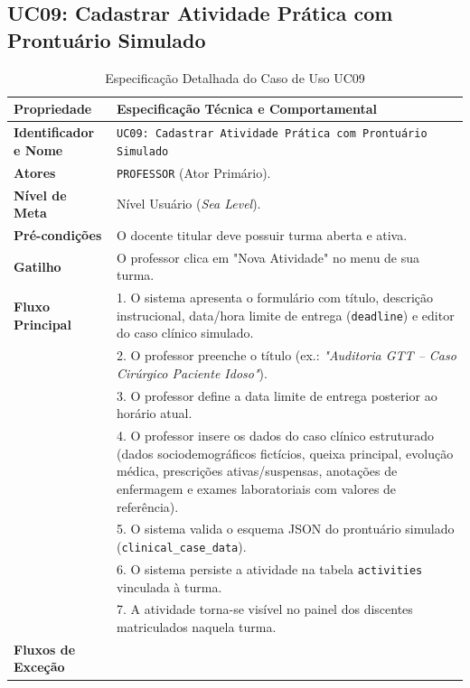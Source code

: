 \subsection{UC09: Cadastrar Atividade Prática com Prontuário Simulado}
\label{uc09_especificacao}

\begin{table}[!ht]
\centering
\caption{Especificação Detalhada do Caso de Uso UC09}
\label{tab_uc09}
\footnotesize
\begin{tabularx}{\textwidth}{p{3.5cm} X}
\toprule
\textbf{Propriedade} & \textbf{Especificação Técnica e Comportamental} \\
\midrule
\textbf{Identificador e Nome} & \texttt{UC09: Cadastrar Atividade Prática com Prontuário Simulado} \\
\textbf{Atores} & \texttt{PROFESSOR} (Ator Primário). \\
\textbf{Nível de Meta} & Nível Usuário (\textit{Sea Level}). \\
\textbf{Pré-condições} & O docente titular deve possuir turma aberta e ativa. \\
\textbf{Gatilho} & O professor clica em "Nova Atividade" no menu de sua turma. \\
\textbf{Fluxo Principal} & 
1. O sistema apresenta o formulário com título, descrição instrucional, data/hora limite de entrega (\texttt{deadline}) e editor do caso clínico simulado.\\
& 2. O professor preenche o título (ex.: \textit{"Auditoria GTT -- Caso Cirúrgico Paciente Idoso"}).\\
& 3. O professor define a data limite de entrega posterior ao horário atual.\\
& 4. O professor insere os dados do caso clínico estruturado (dados sociodemográficos fictícios, queixa principal, evolução médica, prescrições ativas/suspensas, anotações de enfermagem e exames laboratoriais com valores de referência).\\
& 5. O sistema valida o esquema JSON do prontuário simulado (\texttt{clinical\_case\_data}).\\
& 6. O sistema persiste a atividade na tabela \texttt{activities} vinculada à turma.\\
& 7. A atividade torna-se visível no painel dos discentes matriculados naquela turma. \\
\textbf{Fluxos de Exceção} & 

\end{tabularx}
\end{table}
